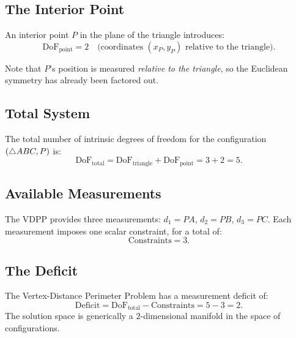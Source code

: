 \subsection{The Interior Point}

An interior point $P$ in the plane of the triangle introduces:
\begin{equation}
\text{DoF}_{\text{point}} = 2 \quad \text{(coordinates $(x_P, y_P)$ relative to the triangle)}.
\end{equation}

Note that $P$'s position is measured \emph{relative to the triangle}, so the Euclidean symmetry has already been factored out.

\subsection{Total System}

The total number of intrinsic degrees of freedom for the configuration $(\triangle ABC, P)$ is:
\begin{equation}
\text{DoF}_{\text{total}} = \text{DoF}_{\text{triangle}} + \text{DoF}_{\text{point}} = 3 + 2 = 5.
\end{equation}

\subsection{Available Measurements}

The VDPP provides three measurements: $d_1 = PA$, $d_2 = PB$, $d_3 = PC$. Each measurement imposes one scalar constraint, for a total of:
\begin{equation}
\text{Constraints} = 3.
\end{equation}

\subsection{The Deficit}

\begin{theorem}
\label{thm:underdetermined}
The Vertex-Distance Perimeter Problem has a measurement deficit of:
\begin{equation}
\boxed{\text{Deficit} = \text{DoF}_{\text{total}} - \text{Constraints} = 5 - 3 = 2.}
\end{equation}
The solution space is generically a $2$-dimensional manifold in the space of configurations.
\end{theorem}

